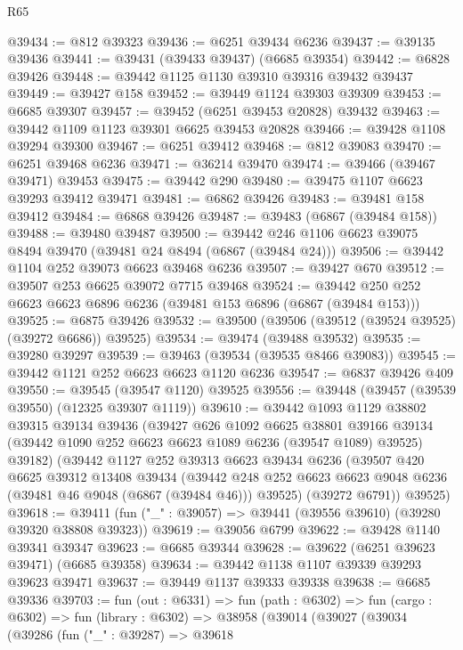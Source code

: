 \begin{lexlean}{R65}
\begin{coremodule}
{@39434 := @812 @39323
@39436 := @6251 @39434 @6236
@39437 := @39135 @39436
@39441 := @39431 (@39433 @39437) (@6685 @39354)
@39442 := @6828 @39426
@39448 := @39442 @1125 @1130 @39310 @39316 @39432 @39437
@39449 := @39427 @158
@39452 := @39449 @1124 @39303 @39309
@39453 := @6685 @39307
@39457 := @39452 (@6251 @39453 @20828) @39432
@39463 := @39442 @1109 @1123 @39301 @6625 @39453 @20828
@39466 := @39428 @1108 @39294 @39300
@39467 := @6251 @39412
@39468 := @812 @39083
@39470 := @6251 @39468 @6236
@39471 := @36214 @39470
@39474 := @39466 (@39467 @39471) @39453
@39475 := @39442 @290
@39480 := @39475 @1107 @6623 @39293 @39412 @39471
@39481 := @6862 @39426
@39483 := @39481 @158 @39412
@39484 := @6868 @39426
@39487 := @39483 (@6867 (@39484 @158))
@39488 := @39480 @39487
@39500 := @39442 @246 @1106 @6623 @39075 @8494 @39470 (@39481 @24 @8494 (@6867 (@39484 @24)))
@39506 := @39442 @1104 @252 @39073 @6623 @39468 @6236
@39507 := @39427 @670
@39512 := @39507 @253 @6625 @39072 @7715 @39468
@39524 := @39442 @250 @252 @6623 @6623 @6896 @6236 (@39481 @153 @6896 (@6867 (@39484 @153)))
@39525 := @6875 @39426
@39532 := @39500 (@39506 (@39512 (@39524 @39525) (@39272 @6686)) @39525)
@39534 := @39474 (@39488 @39532)
@39535 := @39280 @39297
@39539 := @39463 (@39534 (@39535 @8466 @39083))
@39545 := @39442 @1121 @252 @6623 @6623 @1120 @6236
@39547 := @6837 @39426 @409
@39550 := @39545 (@39547 @1120) @39525
@39556 := @39448 (@39457 (@39539 @39550) (@12325 @39307 @1119))
@39610 := @39442
    @1093
    @1129
    @38802
    @39315
    @39134
    @39436
    (@39427
      @626
      @1092
      @6625
      @38801
      @39166
      @39134
      (@39442 @1090 @252 @6623 @6623 @1089 @6236 (@39547 @1089) @39525)
      @39182)
    (@39442
      @1127
      @252
      @39313
      @6623
      @39434
      @6236
      (@39507
        @420
        @6625
        @39312
        @13408
        @39434
        (@39442 @248 @252 @6623 @6623 @9048 @6236 (@39481 @46 @9048 (@6867 (@39484 @46))) @39525)
        (@39272 @6791))
      @39525)
@39618 := @39411 (fun ("_" : @39057) => @39441 (@39556 @39610) (@39280 @39320 @38808 @39323))
@39619 := @39056 @6799
@39622 := @39428 @1140 @39341 @39347
@39623 := @6685 @39344
@39628 := @39622 (@6251 @39623 @39471) (@6685 @39358)
@39634 := @39442 @1138 @1107 @39339 @39293 @39623 @39471
@39637 := @39449 @1137 @39333 @39338
@39638 := @6685 @39336
@39703 := fun (out : @6331) =>
  fun (path : @6302) =>
  fun (cargo : @6302) =>
  fun (library : @6302) =>
  @38958
    (@39014
      (@39027
        (@39034
          (@39286
            (fun ("_" : @39287) =>
            @39618
}
\end{coremodule}
\end{lexlean}
